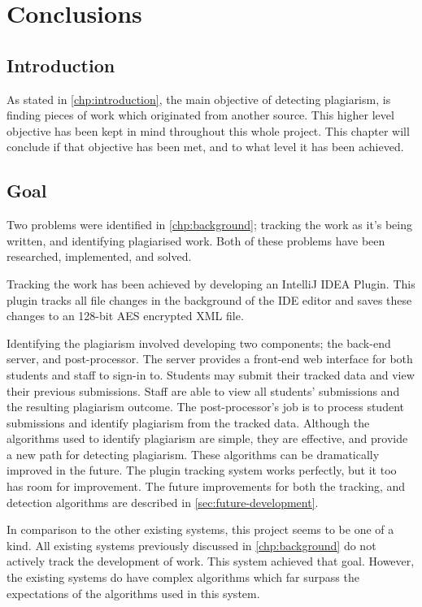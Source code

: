 \chapter{Conclusions}
\section{Introduction}
As stated in \autoref{chp:introduction}, the main objective of detecting plagiarism, is finding pieces of work which originated from another source. This higher level objective has been kept in mind throughout this whole project. This chapter will conclude if that objective has been met, and to what level it has been achieved.

\section{Goal}
Two problems were identified in \autoref{chp:background}; tracking the work as it's being written, and identifying plagiarised work. Both of these problems have been researched, implemented, and solved.

Tracking the work has been achieved by developing an IntelliJ IDEA Plugin. This plugin tracks all file changes in the background of the IDE editor and saves these changes to an 128-bit AES encrypted XML file.

Identifying the plagiarism involved developing two components; the back-end server, and post-processor. The server provides a front-end web interface for both students and staff to sign-in to. Students may submit their tracked data and view their previous submissions. Staff are able to view all students' submissions and the resulting plagiarism outcome. The post-processor's job is to process student submissions and identify plagiarism from the tracked data. Although the algorithms used to identify plagiarism are simple, they are effective, and provide a new path for detecting plagiarism. These algorithms can be dramatically improved in the future. The plugin tracking system works perfectly, but it too has room for improvement. The future improvements for both the tracking, and detection algorithms are described in \autoref{sec:future-development}.

In comparison to the other existing systems, this project seems to be one of a kind. All existing systems previously discussed in \autoref{chp:background} do not actively track the development of work. This system achieved that goal. However, the existing systems do have complex algorithms which far surpass the expectations of the algorithms used in this system.

